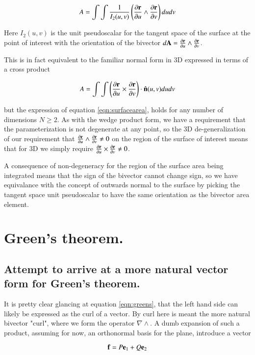 \documentclass{article}
\newcommand{\grad}[0]{\nabla}
\newcommand{\PD}[2]{\frac{\partial {#2}}{\partial {#1}}}
\begin{document}
\begin{equation}\label{eqn:surfacearea}
A = \int\int \inv{I_2(u,v)} \left(\PD{u}{\Br} \wedge \PD{v}{\Br}\right) du dv
\end{equation}

Here $I_2(u,v)$ is the unit pseudoscalar for the tangent space of the surface at the point of interest with the orientation of the bivector 
$d\BA = \PD{u}{\Br} \wedge \PD{v}{\Br}$.

This is in fact equivalent to the familiar normal form in 3D expressed in terms
of a cross product

\begin{equation}
A = \int\int \left(\PD{u}{\Br} \cross \PD{v}{\Br}\right) \cdot \ncap(u,v) du dv
\end{equation}

but the expression of equation \ref{eqn:surfacearea}, holds for any number of dimensions $N \ge 2$.  As with the wedge product form, we have a requirement that the parameterization is not degenerate at any point, so the 3D de-generalization of our requirement that
$\PD{u}{\Br} \wedge \PD{v}{\Br} \ne 0$
on the region of the surface of interest means that for 3D we simply require
$\PD{u}{\Br} \cross \PD{v}{\Br} \ne 0$.

A consequence of non-degeneracy for the region of the surface area being integrated means that the sign of the bivector cannot change sign, so we have equivalance with the concept of outwards normal to the surface by picking the tangent space unit pseudoscalar to have the same orientation as the bivector area element.

\section{ Green's theorem. }

\subsection{ Attempt to arrive at a more natural vector form for Green's theorem. }

It is pretty clear glancing at equation \ref{eqn:greens}, that the left
hand side can likely be expressed as the curl of a vector.  By curl here
is meant the more natural bivector "curl", where we form the operator $\grad \wedge$.  A dumb expansion of such a product,
assuming for now, an orthonormal basis for the plane, introduce a vector

\begin{equation*}
\mathbf{f} = P \mathbf{e}_1 + Q \mathbf{e}_2
\end{equation*}
\end{document}
